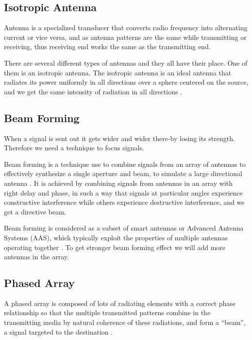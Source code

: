 \subsection{Isotropic Antenna}
Antenna is a specialized transducer that converts radio frequency into alternating current or vice versa, and as antenna patterns are the same while transmitting or receiving, thus receiving end works the same as the transmitting end.

There are several different types of antennas and they all have their place. One of them is an isotropic antenna. The isotropic antenna is an ideal antenna that radiates its power uniformly in all directions over a sphere centered on the source, and we get the same intensity of radiation in all directions \cite{balanis1992antenna}.

\subsection{Beam Forming}

When a signal is sent out it gets wider and wider there-by losing its strength. Therefore we need a technique to focus signals.

Beam forming is a technique use to combine signals from an array of antennas to effectively synthesize a single aperture and beam, to simulate a large directional antenna \cite{van1988beamforming}. It is achieved by combining signals from antennas in an array with right delay and phase, in such a way that signals at particular angles experience constructive interference while others experience destructive interference, and we get a directive beam.

Beam forming is considered as a subset of smart antennas or Advanced Antenna Systems (AAS), which typically exploit the properties of multiple antennas operating together \cite{mouhamadou2006smart}. To get stronger beam forming effect we will add more antennas in the array.

\subsection{Phased Array}

A phased array is composed of lots of radiating elements with a correct phase relationship so that the multiple transmitted patterns combine in the transmitting media by natural coherence of these radiations, and form a “beam”, a signal targeted to the destination \cite{sylvania1966phased}.

